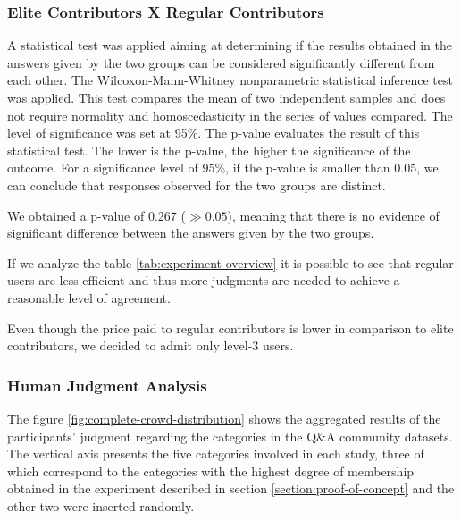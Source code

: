 \subsubsection{\hspace*{3pt} Elite Contributors X Regular Contributors}


A statistical test was applied aiming at determining if the results obtained in the answers given by the two groups can be considered significantly different from each other. The Wilcoxon-Mann-Whitney nonparametric statistical inference test was applied\cite{feltovich2003nonparametric}. This test compares the mean of two independent samples and does not require normality and homoscedasticity in the series of values compared. The level of significance was set at 95\%. The p-value evaluates the result of this statistical test. The lower is the p-value, the higher the significance of the outcome. For a significance level of 95\%, if the p-value is smaller than 0.05, we can conclude that responses observed for the two groups are distinct. 

We obtained a p-value of  0.267 ($\gg 0.05$), meaning that there is no evidence of significant difference between the answers given by the two groups. 

If we analyze the table \ref{tab:experiment-overview} it is possible to see that regular users are less efficient and thus more judgments are needed to achieve a reasonable level of agreement. 

Even though the price paid to regular contributors is lower in comparison to elite contributors, we decided to admit only level-3 users.

\subsubsection{\hspace*{3pt} Human Judgment Analysis}

The figure \ref{fig:complete-crowd-distribution} shows the aggregated results of the participants' judgment regarding the categories in the Q\&A community datasets. The vertical axis presents the five categories involved in each study, three of which correspond to the categories with the highest degree of membership obtained in the experiment described in section \ref{section:proof-of-concept} and the other two were inserted randomly.






